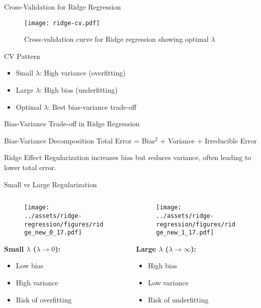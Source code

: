 \documentclass{beamer}
\begin{document}
\begin{frame}{Cross-Validation for Ridge Regression}
\begin{figure}
\centering
\texttt{[image: ridge-cv.pdf]}
\caption{Cross-validation curve for Ridge regression showing optimal $\lambda$}
\end{figure}

\begin{keypointsbox}{CV Pattern}
\begin{itemize}
\item Small $\lambda$: High variance (overfitting)
\item Large $\lambda$: High bias (underfitting)  
\item Optimal $\lambda$: Best bias-variance trade-off
\end{itemize}
\end{keypointsbox}
\end{frame}

\begin{frame}{Bias-Variance Trade-off in Ridge Regression}
\begin{theorembox}{Bias-Variance Decomposition}
Total Error = Bias$^2$ + Variance + Irreducible Error
\end{theorembox}
\pause

\begin{keypointsbox}{Ridge Effect}
Regularization increases bias but reduces variance, often leading to lower total error.
\end{keypointsbox}
\end{frame}

\begin{frame}{Small vs Large Regularization}
\begin{columns}
\begin{column}{0.48\textwidth}
\begin{figure}
\texttt{[image: ../assets/ridge-regression/figures/ridge\_new\_0\_17.pdf]}
\end{figure}
\textbf{Small $\lambda$ ($\lambda \to 0$):}
\begin{itemize}
\item Low bias
\item High variance
\item Risk of overfitting
\end{itemize}
\end{column}
\begin{column}{0.48\textwidth}
\begin{figure}
\texttt{[image: ../assets/ridge-regression/figures/ridge\_new\_1\_17.pdf]}
\end{figure}
\textbf{Large $\lambda$ ($\lambda \to \infty$):}
\begin{itemize}
\item High bias
\item Low variance  
\item Risk of underfitting
\end{itemize}
\end{column}
\end{columns}
\end{frame}
\end{document}
